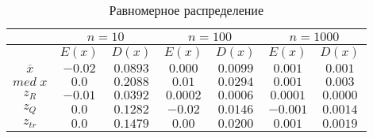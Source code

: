 \documentclass[12pt,a4paper]{article}
\begin{document}
\begin{center}
		\begin{table}[h]
			\caption{Равномерное распределение}
			\begin{center}
				\begin{tabular}{|c|c|c|c|c|c|c|}
					\hline
					& \multicolumn{2}{c|}{$n=10$} & \multicolumn{2}{c|}{$n=100$} & \multicolumn{2}{c|}{$n=1000$}\\
					\hline
					& $E(x)$ & $D(x)$ & $E(x)$ & $D(x)$ & $E(x)$ & $D(x)$\\
					\hline
					$\overline{x}$ & $-0.02$ & $0.0893$ & $0.000$ & $0.0099$ & $0.001$ & $0.001$\\
					\hline
					$med\;x$ & $0.0$ & $0.2088$ & $0.01$ & $0.0294$ & $0.001$ & $0.003$\\
					\hline
					$z_R$ & $-0.01$ & $0.0392$ & $0.0002$ & $0.0006$ & $0.0001$ & $0.0000$\\
					\hline
					$z_Q$ & $0.0$ & $0.1282$ & $-0.02$ & $0.0146$ & $-0.001$ & $0.0014$\\
					\hline
					$z_{tr}$ & $0.0$ & $0.1479$ & $0.00$ & $0.0200$ & $0.001$ & $0.0019$\\
					\hline
				\end{tabular}
			\end{center}
		\end{table}
	\end{center}
\end{document}
